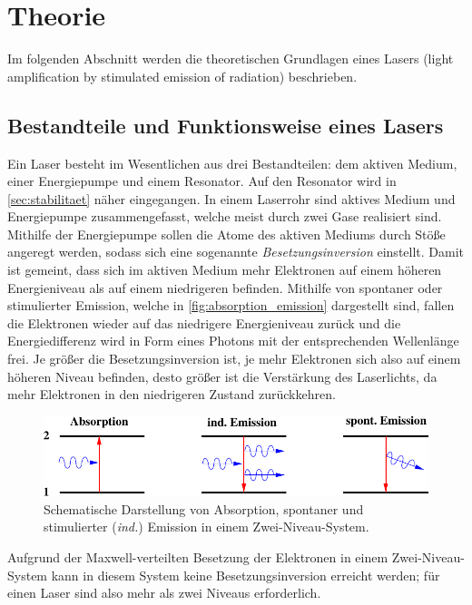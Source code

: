 \section{Theorie}
\label{sec:theorie}

    Im folgenden Abschnitt werden die theoretischen Grundlagen eines Lasers (light amplification by stimulated emission of radiation) beschrieben.

\subsection{Bestandteile und Funktionsweise eines Lasers}

    Ein Laser besteht im Wesentlichen aus drei Bestandteilen:
    dem aktiven Medium, einer Energiepumpe und einem Resonator.
    Auf den Resonator wird in \autoref{sec:stabilitaet} näher eingegangen.
    In einem Laserrohr sind aktives Medium und Energiepumpe zusammengefasst,
    welche meist durch zwei Gase realisiert sind.
    Mithilfe der Energiepumpe sollen die Atome des aktiven Mediums durch Stöße angeregt werden,
    sodass sich eine sogenannte \textit{Besetzungsinversion} einstellt.
    Damit ist gemeint,
    dass sich im aktiven Medium mehr Elektronen auf einem höheren Energieniveau als auf einem niedrigeren befinden.
    Mithilfe von spontaner oder stimulierter Emission,
    welche in \autoref{fig:absorption_emission} dargestellt sind,
    fallen die Elektronen wieder auf das niedrigere Energieniveau zurück
    und die Energiedifferenz wird in Form eines Photons mit der entsprechenden Wellenlänge frei.
    Je größer die Besetzungsinversion ist,
    je mehr Elektronen sich also auf einem höheren Niveau befinden,
    desto größer ist die Verstärkung des Laserlichts,
    da mehr Elektronen in den niedrigeren Zustand zurückkehren.
    \begin{figure}[H]
       \centering
       \includegraphics[width=\textwidth]{content/img/Altanleitung/Abb_1_edit.pdf}
       \caption{Schematische Darstellung von Absorption, spontaner und stimulierter (\textit{ind.}) Emission in einem Zwei-Niveau-System. \cite{versuchsanleitung}}
       \label{fig:absorption_emission}
    \end{figure}
    Aufgrund der Maxwell-verteilten Besetzung der Elektronen in einem Zwei-Niveau-System kann in diesem System keine Besetzungsinversion erreicht werden;
    für einen Laser sind also mehr als zwei Niveaus erforderlich.



